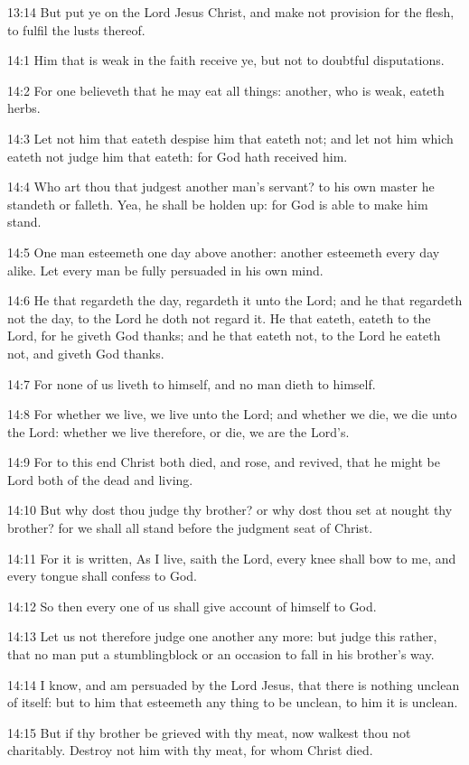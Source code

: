13:14 But put ye on the Lord Jesus Christ, and make not provision for the flesh, to fulfil the lusts thereof.

14:1 Him that is weak in the faith receive ye, but not to doubtful disputations.

14:2 For one believeth that he may eat all things: another, who is weak, eateth herbs.

14:3 Let not him that eateth despise him that eateth not; and let not him which eateth not judge him that eateth: for God hath received him.

14:4 Who art thou that judgest another man's servant? to his own master he standeth or falleth. Yea, he shall be holden up: for God is able to make him stand.

14:5 One man esteemeth one day above another: another esteemeth every day alike. Let every man be fully persuaded in his own mind.

14:6 He that regardeth the day, regardeth it unto the Lord; and he that regardeth not the day, to the Lord he doth not regard it. He that eateth, eateth to the Lord, for he giveth God thanks; and he that eateth not, to the Lord he eateth not, and giveth God thanks.

14:7 For none of us liveth to himself, and no man dieth to himself.

14:8 For whether we live, we live unto the Lord; and whether we die, we die unto the Lord: whether we live therefore, or die, we are the Lord's.

14:9 For to this end Christ both died, and rose, and revived, that he might be Lord both of the dead and living.

14:10 But why dost thou judge thy brother? or why dost thou set at nought thy brother? for we shall all stand before the judgment seat of Christ.

14:11 For it is written, As I live, saith the Lord, every knee shall bow to me, and every tongue shall confess to God.

14:12 So then every one of us shall give account of himself to God.

14:13 Let us not therefore judge one another any more: but judge this rather, that no man put a stumblingblock or an occasion to fall in his brother's way.

14:14 I know, and am persuaded by the Lord Jesus, that there is nothing unclean of itself: but to him that esteemeth any thing to be unclean, to him it is unclean.

14:15 But if thy brother be grieved with thy meat, now walkest thou not charitably. Destroy not him with thy meat, for whom Christ died.


